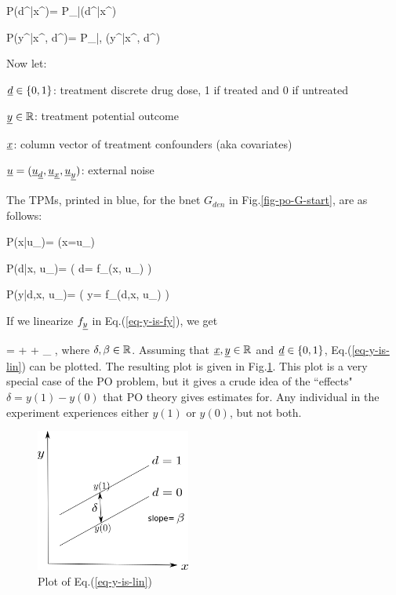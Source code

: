 \beq\color{blue}
P(d^\s|x^\s)=
P_{\rvd|\rvx}(d^\s|x^\s)
\eeq


\beq\color{blue}
P(y^\s|x^\s, d^\s)=
P_{\rvy|\rvx, \rvd}(y^\s|x^\s, d^\s)
\eeq




Now let:

${\underline{d}}\in\{0,1\}$: treatment discrete drug dose,  1 if treated and 0 if untreated

${\underline{y}}\in { \mathbb{R}}$:
 treatment potential outcome

${\underline{x}}$: column vector of 
treatment
confounders (aka covariates)


${\underline{u}}=({\underline{u}}_{\underline{d}}, {\underline{u}}_{\underline{x}}, {\underline{u}}_{\underline{y}})$:
external noise

The TPMs, printed in blue,
for the bnet
$G_{den}$
in Fig.\ref{fig-po-G-start},
are as follows:


\beq \color{blue}
P(x|u_\rvx)= \indi(\;\;x=u_\rvx\;\;)
\eeq

\beq\color{blue}
P(d|x, u_\rvd)=
\indi( \;\; d= f_\rvd(x, u_\rvd)
\;\;)
\eeq

\beq\color{blue}
P(y|d,x, u_\rvy)=
\indi( \;\; y= f_\rvy(d,x, u_\rvy)
\;\;)
\label{eq-y-is-fy}
\eeq

If we linearize
 $f_{\underline{y}}$ in Eq.(\ref{eq-y-is-fy}),
we get

\beqa
\rvy =
\delta \rvd + \beta \rvx + \rvu_\rvy
\;,
\label{eq-y-is-lin}
\eeqa
where $\delta, \beta\in { \mathbb{R}}$.
Assuming
that ${\underline{x}}, {\underline{y}}\in { \mathbb{R}}$
and ${\underline{d}}\in \{0,1\}$,
Eq.(\ref{eq-y-is-lin}) can be plotted.
The resulting plot
is given in Fig.\ref{fig-po-two-parallel-lines}.
This plot
is a very special
case of the PO problem,
but it gives a crude idea
of the ``effects" $\delta
= y(1)-y(0)$ that PO theory 
gives estimates for.
Any 
individual in the experiment
experiences either $y(1)$
or $y(0)$,
but not both.



\begin{figure}[h!]
\centering
\includegraphics[width=2in]
{pot-out/two-parallel-lines.png}
\caption{Plot  of
Eq.(\ref{eq-y-is-lin})} 
\label{fig-po-two-parallel-lines}
\end{figure}




